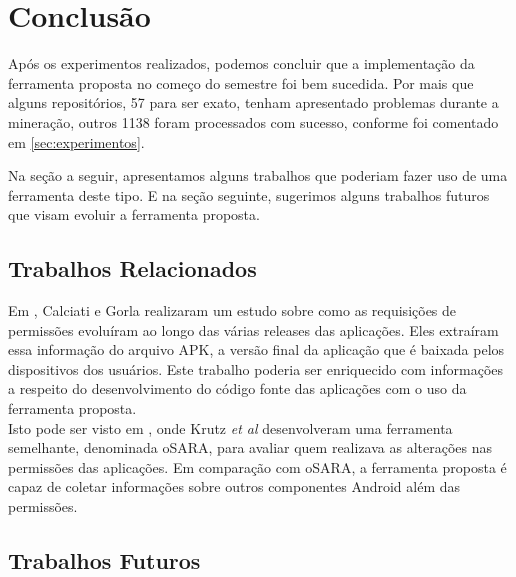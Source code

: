 \documentclass[a4paper,12pt]{article}
\begin{document}
{%
\newpage

\section{Conclusão}%

Após os experimentos realizados, podemos concluir que a implementação da ferramenta proposta no começo do semestre foi bem sucedida. Por mais que alguns repositórios, 57 para ser exato, tenham apresentado problemas durante a mineração, outros 1138 foram processados com sucesso, conforme foi comentado em \ref{sec:experimentos}.

Na seção a seguir, apresentamos alguns trabalhos que poderiam fazer uso de uma ferramenta deste tipo. E na seção seguinte, sugerimos alguns trabalhos futuros que visam evoluir a ferramenta proposta.


\subsection{Trabalhos Relacionados}%

Em \cite{Calciati}, Calciati e Gorla realizaram um estudo sobre como as requisições de permissões evoluíram ao longo das várias releases das aplicações. Eles extraíram essa informação do arquivo APK, a versão final da aplicação que é baixada pelos dispositivos dos usuários. Este trabalho poderia ser enriquecido com informações a respeito do desenvolvimento do código fonte das aplicações com o uso da ferramenta proposta. \\

Isto pode ser visto em \cite{WhoAdded}, onde Krutz \textit{et al} desenvolveram uma ferramenta semelhante, denominada oSARA, para avaliar quem realizava as alterações nas permissões das aplicações. Em comparação com oSARA, a ferramenta proposta é capaz de coletar informações sobre outros componentes Android além das permissões.\\

\subsection{Trabalhos Futuros}

}
\end{document}
